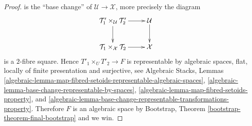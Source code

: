 \documentclass{stacks-project}
\theoremstyle{plain}
\theoremstyle{definition}
\theoremstyle{remark}
\numberwithin{equation}{subsection}
\begin{document}
\begin{proof}
is the ``base change'' of $\mathcal{U} \to \mathcal{X}$, more precisely
the diagram
$$
\xymatrix{
\mathcal{T}_1' \times_\mathcal{U} \mathcal{T}_2' \ar[d] \ar[r] &
\mathcal{U} \ar[d] \\
\mathcal{T}_1 \times_{\mathcal X} \mathcal{T}_2 \ar[r] &
\mathcal{X}
}
$$
is a $2$-fibre square.
Hence $T'_1 \times_U T'_2 \to F$ is representable by algebraic spaces,
flat, locally of finite presentation and surjective, see
Algebraic Stacks, Lemmas
\ref{algebraic-lemma-map-fibred-setoids-representable-algebraic-spaces},
\ref{algebraic-lemma-base-change-representable-by-spaces},
\ref{algebraic-lemma-map-fibred-setoids-property}, and
\ref{algebraic-lemma-base-change-representable-transformations-property}.
Therefore $F$ is an algebraic space by
Bootstrap, Theorem \ref{bootstrap-theorem-final-bootstrap}
and we win.
\end{proof}
\end{document}
